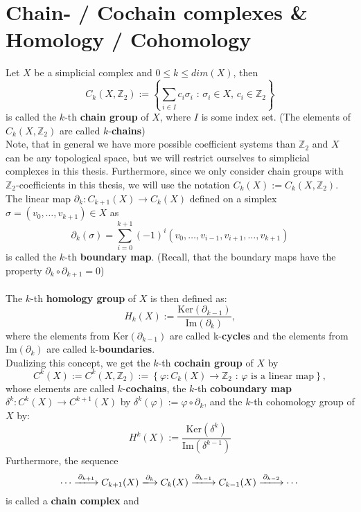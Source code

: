 \section{Chain- / Cochain complexes \& Homology / Cohomology}

Let \(X\) be a simplicial complex and \(0\leq k\leq dim(X)\), then
\[
C_k(X,\mathbb{Z}_2):=\left\{\sum\limits_{i\in I}c_i\sigma_i\text{ : }\sigma_i\in X\text{, }c_i\in\mathbb{Z}_2\right\}
\]
is called the \(k\)-th \textbf{chain group} of \(X\), where \(I\) is some index set. (The elements of \(C_k(X,\mathbb{Z}_2)\) are called \(k\)-\textbf{chains})\\
Note, that in general we have more possible coefficient systems than \(\mathbb{Z}_2\) and \(X\) can be any topological space, but we will restrict ourselves to simplicial complexes in this thesis. Furthermore, since we only consider chain groups with \(\mathbb{Z}_2\)-coefficients in this thesis, we will use the notation \(C_k(X):=C_k(X,\mathbb{Z}_2)\).\\
The linear map \(\partial_k:C_{k+1}(X)\rightarrow C_k(X)\) defined on a simplex \(\sigma=(v_0,\ldots,v_{k+1})\in X\) as
\[
\partial_k(\sigma)=\sum\limits_{i=0}^{k+1}(-1)^i(v_0,\ldots,v_{i-1},v_{i+1},\ldots,v_{k+1})
\]
is called the \(k\)-th \textbf{boundary map}. (Recall, that the boundary maps have the property \(\partial_k\circ\partial_{k+1}=0\))\\
\\
The \(k\)-th \textbf{homology group} of \(X\) is then defined as:
\[
H_k(X):=\frac{\text{Ker}(\partial_{k-1})}{\text{Im}(\partial_k)},
\]
where the elements from \(\text{Ker}(\partial_{k-1})\) are called k-\textbf{cycles} and the elements from \(\text{Im}(\partial_k)\) are called k-\textbf{boundaries}.\\
Dualizing this concept, we get the \(k\)-th \textbf{cochain group} of \(X\) by
\[
C^k(X):=C^k(X,\mathbb{Z}_2):=\left\{\varphi:C_k(X)\rightarrow\mathbb{Z}_2\text{ : }\varphi\text{ is a linear map}\right\},
\]
whose elements are called \(k\)-\textbf{cochains}, the \(k\)-th \textbf{coboundary map}\\
\(\delta^k:C^k(X)\rightarrow C^{k+1}(X)\) by \(\delta^k(\varphi):=\varphi\circ\partial_k\), and the \(k\)-th cohomology group of \(X\) by:
\[
H^k(X):=\frac{\text{Ker}(\delta^k)}{\text{Im}(\delta^{k-1})}
\]
Furthermore, the sequence
\[
\cdots\xlongrightarrow{\partial_{k+1}} C_{k+1}(X)\xlongrightarrow{\partial_k} C_k(X)\xlongrightarrow{\partial_{k-1}} C_{k-1}(X)\xlongrightarrow{\partial_{k-2}}\cdots
\]
is called a \textbf{chain complex} and
